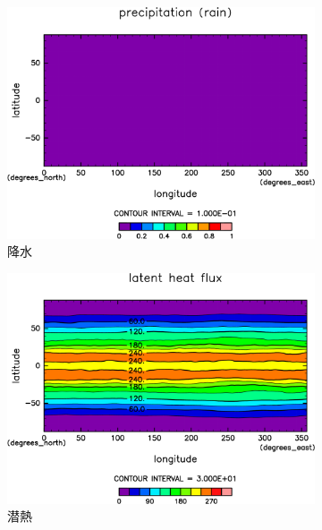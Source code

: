\documentclass[body]{subfiles}
\begin{document}
\begin{figure}[t]
\begin{subfigure}{.4\textwidth}
		\includegraphics[width=\columnwidth]{S1366-nc/Rain,time=3650:4015-crop-rotate.pdf}
		\caption{降水\hmu*{[W/m^{-2}]}}\label{S1366nc降水}
	\end{subfigure}
	\begin{subfigure}{.4\textwidth}
		\centering
		\includegraphics[width=\columnwidth]{S1366-nc/Evap,time=3650:4015-crop-rotate.pdf}
		\caption{潜熱\hmu*{[W/m^{-2}]}}\label{S1366nc潜熱}
	\end{subfigure}
	\begin{subfigure}{.4\textwidth}
		\centering

\end{subfigure}
\end{figure}
\end{document}
